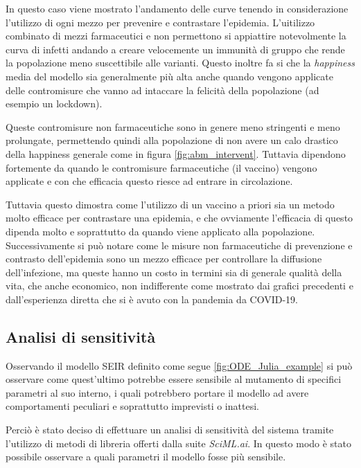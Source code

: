 In questo caso viene mostrato l'andamento delle curve tenendo in considerazione l'utilizzo di ogni mezzo
per prevenire e contrastare l'epidemia. L'uitilizzo combinato di mezzi farmaceutici e non permettono 
si appiattire notevolmente la curva di infetti andando a creare velocemente un immunità di gruppo 
che rende la popolazione meno suscettibile alle varianti. Questo inoltre fa si che la \emph{happiness} media
del modello sia generalmente più alta anche quando vengono applicate delle contromisure che vanno ad 
intaccare la felicità della popolazione (ad esempio un lockdown). 

Queste contromisure non farmaceutiche sono in genere meno stringenti e meno prolungate, permettendo quindi
alla popolazione di non avere un calo drastico della happiness generale come in figura \ref{fig:abm_intervent}.
Tuttavia dipendono fortemente da quando le contromisure farmaceutiche (il vaccino) vengono applicate
e con che efficacia questo riesce ad entrare in circolazione. 

Tuttavia questo dimostra come l'utilizzo di un vaccino a priori sia un metodo molto efficace per contrastare
una epidemia, e che ovviamente l'efficacia di questo dipenda molto e soprattutto da quando viene applicato 
alla popolazione. Successivamente si può notare come le misure non farmaceutiche di prevenzione e contrasto
dell'epidemia sono un mezzo efficace per controllare la diffusione dell'infezione, ma queste hanno un costo 
in termini sia di generale qualità della vita, che anche economico, non indifferente come mostrato dai grafici 
precedenti e dall'esperienza diretta che si è avuto con la pandemia da COVID-19. 

\subsection{Analisi di sensitività}
Osservando il modello SEIR definito come segue \ref{fig:ODE_Julia_example} 
si può osservare come quest'ultimo potrebbe essere sensibile al mutamento di specifici 
parametri al suo interno, i quali potrebbero portare il modello ad avere comportamenti 
peculiari e soprattutto imprevisti o inattesi.

Perciò è stato deciso di effettuare un analisi di sensitività del sistema tramite l'utilizzo 
di metodi di libreria offerti dalla suite \emph{SciML.ai}. In questo modo è stato possibile 
osservare a quali parametri il modello fosse più sensibile.

